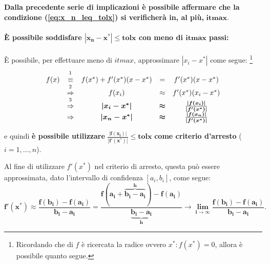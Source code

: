 \addtocounter{footnote}{-1}


\textbf{Dalla precedente serie di implicazioni è possibile affermare che la condizione (\ref{eq:x_n_leq_tolx}) si verificherà in, al più,} $\boldsymbol{itmax}$.

\paragraph{È possibile soddisfare $\boldsymbol{|x_n-x^*|\leq tolx}$ con meno di $\boldsymbol{itmax}$ passi:}
È possibile, per effettuare meno di $itmax$, approssimare $|x_i-x^*|$ come segue:
\footnote{Ricordando che di $f$ è ricercata la radice ovvero $x^*:f(x^*)=0$, allora è possibile quanto segue.}
\begin{equation*}
	\begin{matrix}
		f(x)&\overset{\footnotemark}{\equiv}& f(x^*)+f'(x^*)(x-x^*)&=&f'(x^*)(x-x^*)\\
		&\overset{\footnotemark}{\Rightarrow}&f(x_i)&\approx& f'(x^*)(x_i-x^*)\\
		&\overset{\footnotemark}{\Rightarrow}&\boldsymbol{|x_i-x^*|}&\boldsymbol\approx&\boldsymbol{\frac{|f(x_i)|}{|f'(x^*)|}}\\
		&\Rightarrow&\boldsymbol{|x_n-x^*|}&\boldsymbol\approx&\boldsymbol{\frac{|f(x_n)|}{|f'(x^*)|}}
	\end{matrix}
\end{equation*}

\addtocounter{footnote}{-2}



\noindent e quindi \textbf{è possibile utilizzare} $\boldsymbol{\frac{|f(x_i)|}{|f'(x^*)|}\leq tolx}$ \textbf{come criterio d'arresto} ($i=1,\hdots, n$). 

Al fine di utilizzare $f'(x^*)$ nel criterio di arresto, questa può essere approssimata, dato l'intervallo di confidenza $[a_i, b_i]$, come segue:
\begin{equation}\label{eq:approxf'}
	\boldsymbol{f'(x^*)\approx\frac{f(b_i)-f(a_i)}{b_i-a_i}=\frac{f(a_i+\overbrace{b_i-a_i}^{h})-f(a_i)}{\underbrace{b_i-a_i}_{h}}\rightarrow \lim_{i\to\infty}\frac{f(b_i)-f(a_i)}{b_i-a_i}}.
\end{equation}

